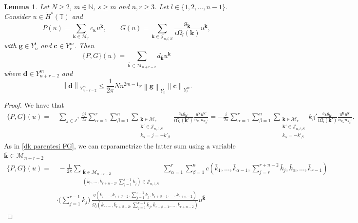 \documentclass[a4paper,10pt,reqno]{article}
\theoremstyle{definition}
\theoremstyle{plain}
\theoremstyle{plain}
\theoremstyle{definition}
\theoremstyle{plain}
\theoremstyle{plain}
\theoremstyle{plain}
\newtheorem{lemma}[definition]{Lemma}
\theoremstyle{definition}
\theoremstyle{definition}
\newcommand{\norm}[1]{\left\lVert #1 \right\rVert}
\def \N{\mathbb N}
\def \Z{\mathbb Z}
\def \T{\mathbb{T}}
\def \J{\mathcal{J}}
\def \k{\bm{k}}
\begin{document}
\begin{lemma} \label{lemma: stabilità parentesi poisson}
Let $N \ge 2$, $m \in \N$, $s \ge m$ and $n,r \ge 3$.
Let $l \in \{ 1,2,\ldots,n-1\}$. 
Consider $u \in \dot{H}^s(\T)$ and
\[
P(u) = \sum_{\k \in \mathcal{M}_r} c_{\k} u^{\k}, \qquad G(u) = \sum_{\k \in \mathcal{J}_{n,l,N}} \frac{g_{\k}}{i \Omega_l(\k)} u^{\k},
\]
with $\bm{g} \in Y_n^l$ and $\bm{c} \in Y_r^m$. 
Then
\[
\{ P,G \}(u) = \sum_{\bar{\k} \in \mathcal{M}_{n+r-2}} d_{\bar{\k}} u^{\bar{\k}}
\]
where $\bm{d} \in Y_{n+r-2}^m$ and 
\begin{equation}\label{d_est}
\norm{\bm{d}}_{Y_{n+r-2}^m} \le \frac{1}{2\pi} N n^{2m-1} r \norm{\bm{g}}_{Y_n^l} \norm{\bm{c}}_{Y_r^m}.
\end{equation}
\end{lemma}
\begin{proof}
We have that
\[
\begin{split}
\{ P,G \}(u) =&\ \sum_{j \in \Z^*} \frac{ij}{2\pi} \sum_{\alpha = 1}^r \sum_{\beta=1}^n \sum_{ \substack{ \k \in \mathcal{M}_r \\ \k' \in \mathcal{J}_{n,l,N} \\ k_{\alpha} = j = -k'_{\beta}}} \frac{c_{\k} g_{\k'}}{i \Omega_l(\k')} \frac{u^{\k} u^{\k'}}{u_{k_{\alpha}}u_{k_{\beta}'}} = - \frac{i}{2\pi} \sum_{\alpha = 1}^r \sum_{\beta=1}^n \sum_{ \substack{\k \in \mathcal{M}_r \\ \k' \in \mathcal{J}_{n,l,N} \\ k_{\alpha} = -k'_{\beta}}} k_{\beta}' \frac{c_{\k} g_{\k'}}{i \Omega_l(\k')} \frac{u^{\k} u^{\k'}}{u_{k_{\alpha}}u_{k_{\beta}'}}.
\end{split}
\]
As in \eqref{dk parentesi FG}, we can reparametrize the latter sum using a variable $\bar{\k}\in\mathcal{M}_{n+r-2}$
\[
\begin{split}
\{ P,G \}(u) =&\ - \frac{1}{2\pi} \sum_{ \substack{ \bar{\k} \in \mathcal{M}_{n+r-2} \\ (\bar{k}_r,\ldots,\bar{k}_{r+n-2},\sum_{j=1}^{r-1} \bar{k}_j) \in \J_{n,l,N} } } \sum_{\alpha = 1}^r \sum_{\beta=1}^n c(\bar{k}_1,\ldots,\bar{k}_{\alpha-1},\sum_{j=r}^{r+n-2} \bar{k}_j,\bar{k}_{\alpha},\ldots,\bar{k}_{r-1}) \\
& \cdot \big (\sum_{j=1}^{r-1} \bar{k}_j\big )\,\frac{g(\bar{k}_r,\ldots,\bar{k}_{r+\beta-2},\sum_{j=1}^{r-1} \bar{k}_j,\bar{k}_{r+\beta-1},\ldots,\bar{k}_{r+n-2})}{\Omega_l(\bar{k}_r,\ldots,\bar{k}_{r+\beta-2},\sum_{j=1}^{r-1} \bar{k}_j,\bar{k}_{r+\beta-1},\ldots,\bar{k}_{r+n-2})} u^{\bar{\k}}

\end{split}\]
\end{proof}
\end{document}
